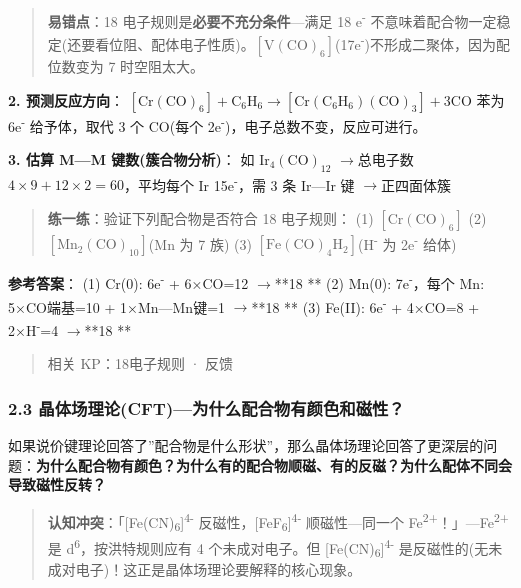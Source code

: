 \documentclass[a4paper,11pt]{ctexart}
\newcommand{\箭}{\ensuremath{\rightarrow}}
\newcommand{\左箭}{\ensuremath{\leftarrow}}
\newcommand{\上箭}{\ensuremath{\uparrow}}
\newcommand{\下箭}{\ensuremath{\downarrow}}
\newcommand{\衡}{\ensuremath{\rightleftharpoons}}
\newcommand{\双箭}{\ensuremath{\leftrightarrow}}
\newcommand{\约等于}{\ensuremath{\approx}}
\newcommand{\小于等于}{\ensuremath{\leq}}
\newcommand{\大于等于}{\ensuremath{\geq}}
\newcommand{\不等于}{\ensuremath{\neq}}
\newcommand{\西格马}{\ensuremath{\sigma}}
\newcommand{\派}{\ensuremath{\pi}}
\begin{document}
\begin{quote}
\textbf{易错点}：18 电子规则是\textbf{必要不充分条件}---满足 18 e\textsuperscript{-} 不意味着配合物一定稳定(还要看位阻、配体电子性质)。\([\mathrm{V(CO)_6}]\)(17e\textsuperscript{-})不形成二聚体，因为配位数变为 7 时空阻太大。
\end{quote}

\textbf{2. 预测反应方向}：
\([\mathrm{Cr(CO)_6}] + \mathrm{C_6H_6} \rightarrow [\mathrm{Cr(C_6H_6)(CO)_3}] + 3\mathrm{CO}\)
苯为 6e\textsuperscript{-} 给予体，取代 3 个 CO(每个 2e\textsuperscript{-})，电子总数不变，反应可进行。

\textbf{3. 估算 M---M 键数(簇合物分析)}：
如 \(\mathrm{Ir_4(CO)_{12}}\) \箭 总电子数 \(4 \times 9 + 12 \times 2 = 60\)，平均每个 Ir 15e\textsuperscript{-}，需 3 条 Ir---Ir 键 \箭 正四面体簇

\begin{quote}
\textbf{练一练}：验证下列配合物是否符合 18 电子规则：
(1) \(\mathrm{[Cr(CO)_6]}\)
(2) \(\mathrm{[Mn_2(CO)_{10}]}\)(Mn 为 7 族)
(3) \(\mathrm{[Fe(CO)_4H_2]}\)(H\textsuperscript{-} 为 2e\textsuperscript{-} 给体)
\end{quote}

\textbf{参考答案}：
(1) Cr(0): 6e\textsuperscript{-} + 6×CO=12 \箭 **18 **
(2) Mn(0): 7e\textsuperscript{-}，每个 Mn: 5×CO端基=10 + 1×Mn---Mn键=1 \箭 **18 **
(3) Fe(II): 6e\textsuperscript{-} + 4×CO=8 + 2×H\textsuperscript{-}=4 \箭 **18 **

\begin{quote}
相关 KP：18电子规则 · 反馈
\end{quote}

\subsubsection{2.3 晶体场理论(CFT)---为什么配合物有颜色和磁性？}\label{ux6676ux4f53ux573aux7406ux8bbacftux4e3aux4ec0ux4e48ux914dux5408ux7269ux6709ux989cux8272ux548cux78c1ux6027}

如果说价键理论回答了''配合物是什么形状''，那么晶体场理论回答了更深层的问题：\textbf{为什么配合物有颜色？为什么有的配合物顺磁、有的反磁？为什么配体不同会导致磁性反转？}

\begin{quote}
\textbf{认知冲突}：「{[}Fe(CN)\textsubscript{6}{]}\textsuperscript{4-} 反磁性，{[}FeF\textsubscript{6}{]}\textsuperscript{4-} 顺磁性---同一个 Fe\textsuperscript{2+}！」---Fe\textsuperscript{2+} 是 d\textsuperscript{6}，按洪特规则应有 4 个未成对电子。但 {[}Fe(CN)\textsubscript{6}{]}\textsuperscript{4-} 是反磁性的(无未成对电子)！这正是晶体场理论要解释的核心现象。
\end{quote}
\end{document}
